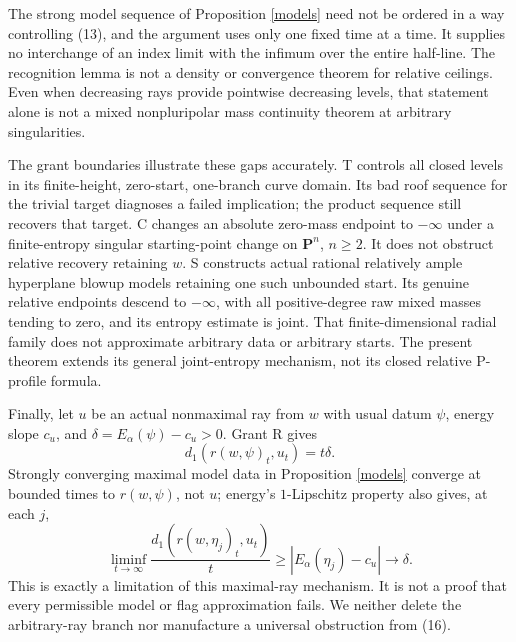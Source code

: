 \documentclass[11pt]{article}
\begin{document}
The strong model sequence of Proposition \ref{models} need not be
ordered in a way controlling (13), and the argument uses only one
fixed time at a time. It supplies no interchange of an index limit
with the infimum over the entire half-line. The recognition lemma
is not a density or convergence theorem for relative ceilings.
Even when decreasing rays provide pointwise decreasing levels,
that statement alone is not a mixed nonpluripolar mass continuity
theorem at arbitrary singularities.

The grant boundaries illustrate these gaps accurately. T controls
all closed levels in its finite-height, zero-start, one-branch curve
domain. Its bad roof sequence for the trivial target diagnoses a
failed implication; the product sequence still recovers that target.
C changes an absolute zero-mass endpoint to $-\infty$ under a
finite-entropy singular starting-point change on $\mathbf P^n$,
$n\ge2$. It does not obstruct relative recovery retaining $w$.
S constructs actual rational relatively ample hyperplane blowup
models retaining one such unbounded start. Its genuine relative
endpoints descend to $-\infty$, with all positive-degree raw
mixed masses tending to zero, and its entropy estimate is joint.
That finite-dimensional radial family does not approximate arbitrary
data or arbitrary starts. The present theorem extends its general
joint-entropy mechanism, not its closed relative P-profile formula.

Finally, let $u$ be an actual nonmaximal ray from $w$ with usual
datum $\psi$, energy slope $c_u$, and
$\delta=E_\alpha(\psi)-c_u>0$. Grant R gives
\[
 d_1(r(w,\psi)_t,u_t)=t\delta.                         \tag{15}
\]
Strongly converging maximal model data in Proposition \ref{models}
converge at bounded times to $r(w,\psi)$, not $u$; energy's
$1$-Lipschitz property also gives, at each $j$,
\[
 \liminf_{t\to\infty}\frac{d_1(r(w,\eta_j)_t,u_t)}t
 \ge |E_\alpha(\eta_j)-c_u|\longrightarrow\delta.
 \tag{16}
\]
This is exactly a limitation of this maximal-ray mechanism.
It is not a proof that every permissible model or flag approximation
fails. We neither delete the arbitrary-ray branch nor manufacture a
universal obstruction from (16).
\end{document}
